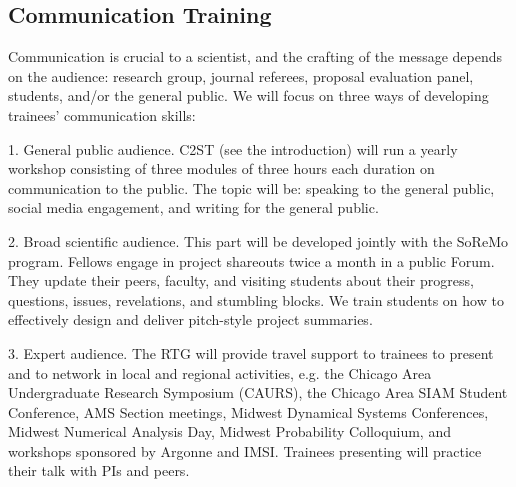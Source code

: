 \documentclass[11pt]{NSFamsart}
\begin{document}
\subsection*{Communication Training}
Communication is crucial to a scientist, and the crafting of the message depends on the audience:  research group, journal referees, proposal evaluation panel, students, and/or the general public. We will focus on three ways of developing trainees' communication skills: 

1. General public audience.  C2ST (see the introduction) will run a yearly workshop consisting of three modules of three hours each duration on communication to the public. The topic will be: speaking to the general public, social media engagement, and writing for the general public.  %

2. Broad scientific audience. %
This part will be developed jointly with the SoReMo program. Fellows engage in project shareouts twice a month in a public Forum. They update their peers, faculty, and visiting students  about their progress, questions, issues, revelations, and stumbling blocks. We  train students on how to effectively design and deliver pitch-style project summaries.

3. Expert audience. %
The RTG will provide travel support to trainees to  present   and to network in local and regional activities, e.g.  the Chicago Area Undergraduate Research Symposium (CAURS), the Chicago Area SIAM Student Conference, AMS Section meetings, Midwest Dynamical Systems Conferences, Midwest Numerical Analysis Day,  Midwest Probability Colloquium, and workshops sponsored by Argonne and IMSI. Trainees presenting will practice their talk  with PIs and peers. \label{C2ST}
\end{document}
